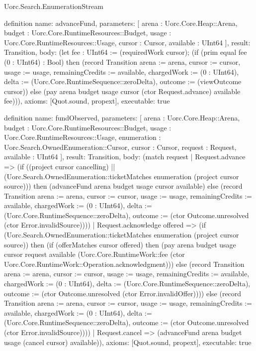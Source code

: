 \begin{lexlean}{Uorc.Search.EnumerationStream}
\begin{semanticmodule}
definition{
  name: advanceFund,
  parameters: [
    arena : Uorc.Core.Heap::Arena,
    budget : Uorc.Core.RuntimeResources::Budget,
    usage : Uorc.Core.RuntimeResources::Usage,
    cursor : Cursor,
    available : UInt64
  ],
  result: Transition,
  body: (let fee : UInt64 := (requiredWork cursor); (if (prim equal fee (0 : UInt64) : Bool) then (record Transition {arena := arena, cursor := cursor, usage := usage, remainingCredits := available, chargedWork := (0 : UInt64), delta := (Uorc.Core.RuntimeSequence::zeroDelta), outcome := (viewOutcome cursor)}) else (pay arena budget usage cursor (ctor Request.advance) available fee))),
  axioms: [Quot.sound, propext],
  executable: true
}

definition{
  name: fundObserved,
  parameters: [
    arena : Uorc.Core.Heap::Arena,
    budget : Uorc.Core.RuntimeResources::Budget,
    usage : Uorc.Core.RuntimeResources::Usage,
    enumeration : Uorc.Search.OwnedEnumeration::Cursor,
    cursor : Cursor,
    request : Request,
    available : UInt64
  ],
  result: Transition,
  body: (match request
    | Request.advance => (if ((project cursor cancelling) || (Uorc.Search.OwnedEnumeration::ticketMatches enumeration (project cursor source))) then (advanceFund arena budget usage cursor available) else (record Transition {arena := arena, cursor := cursor, usage := usage, remainingCredits := available, chargedWork := (0 : UInt64), delta := (Uorc.Core.RuntimeSequence::zeroDelta), outcome := (ctor Outcome.unresolved (ctor Error.invalidSource))}))
    | Request.acknowledge offered => (if (Uorc.Search.OwnedEnumeration::ticketMatches enumeration (project cursor source)) then (if (offerMatches cursor offered) then (pay arena budget usage cursor request available (Uorc.Core.RuntimeWork::fee (ctor Uorc.Core.RuntimeWork::Operation.acknowledgment))) else (record Transition {arena := arena, cursor := cursor, usage := usage, remainingCredits := available, chargedWork := (0 : UInt64), delta := (Uorc.Core.RuntimeSequence::zeroDelta), outcome := (ctor Outcome.unresolved (ctor Error.invalidOffer))})) else (record Transition {arena := arena, cursor := cursor, usage := usage, remainingCredits := available, chargedWork := (0 : UInt64), delta := (Uorc.Core.RuntimeSequence::zeroDelta), outcome := (ctor Outcome.unresolved (ctor Error.invalidSource))}))
    | Request.cancel => (advanceFund arena budget usage (cancel cursor) available)),
  axioms: [Quot.sound, propext],
  executable: true
}


\end{semanticmodule}
\end{lexlean}
